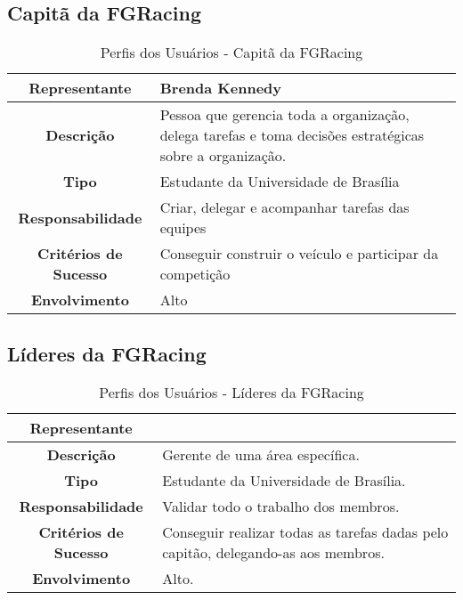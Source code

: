\begin{apendicesenv}
\subsection{Capitã da FGRacing}
\begin{table}[!h]
  \centering
  \caption{Perfis dos Usuários - Capitã da FGRacing}
  \begin{tabular}{|c|l|}
  \hline
  \textbf{Representante}        & Brenda Kennedy                                                                                           \\ \hline
  \textbf{Descrição}            & \parbox[t]{11cm}{Pessoa que gerencia toda a organização, delega tarefas e toma decisões estratégicas sobre a organização.} \\ \hline
  \textbf{Tipo}                 & Estudante da Universidade de Brasília                                                                    \\ \hline
  \textbf{Responsabilidade}     & Criar, delegar e acompanhar tarefas das equipes                                                          \\ \hline
  \textbf{Critérios de Sucesso} & \parbox[t]{11cm}{Conseguir construir o veículo e participar da competição}                                                 \\ \hline
  \textbf{Envolvimento}         & Alto                                                                                            \\ \hline
\end{tabular}
\end{table}

\pagebreak

\subsection{Líderes da FGRacing}
\begin{table}[!h]
  \centering
  \caption{Perfis dos Usuários - Líderes da FGRacing}
  \begin{tabular}{|c|l|}
  \hline
  \textbf{Representante}        &                                                                                   \\ \hline
  \textbf{Descrição}            & Gerente de uma área específica.                                                   \\ \hline
  \textbf{Tipo}                 & Estudante da Universidade de Brasília.                                            \\ \hline
  \textbf{Responsabilidade}     & Validar todo o trabalho dos membros.                                              \\ \hline
  \textbf{Critérios de Sucesso} & \parbox[t]{11cm}{Conseguir realizar todas as tarefas dadas pelo capitão, delegando-as aos membros.} \\ \hline
  \textbf{Envolvimento}         & Alto.                                                                             \\ \hline
\end{tabular}
\end{table}


\end{apendicesenv}

